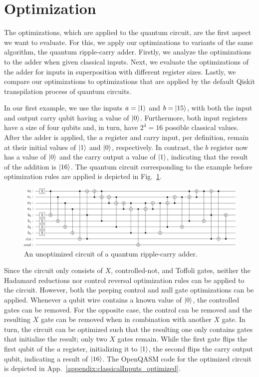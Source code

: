 \section{Optimization}
\label{sec:eval_optimization}
The optimizations, which are applied to the quantum circuit, are the first aspect we want to evaluate. For this, we apply our optimizations to variants of the same algorithm, the quantum ripple-carry adder. Firstly, we analyze the optimizations to the adder when given classical inputs. Next, we evaluate the optimizations of the adder for inputs in superposition with different register sizes. Lastly, we compare our optimizations to optimizations that are applied by the default Qiskit transpilation process of quantum circuits.

In our first example, we use the inputs $a = \ket{1}$ and $b = \ket{15}$, with both the input and output carry qubit having a value of $\ket{0}$. Furthermore, both input registers have a size of four qubits and, in turn, have $2^4 = 16$ possible classical values. After the adder is applied, the $a$ register and carry input, per definition, remain at their initial values of $\ket{1}$ and $\ket{0}$, respectively. In contrast, the $b$ register now has a value of $\ket{0}$ and the carry output a value of $\ket{1}$, indicating that the result of the addition is $\ket{16}$.
The quantum circuit corresponding to the example before optimization rules are applied is depicted in Fig.~\ref{fig:eval_adder_circuit}.
\begin{figure}[htp]
    \centering     
    \includegraphics[width=\textwidth]{../figures/images/adderCircuit.png}
    \caption{An unoptimized circuit of a quantum ripple-carry adder.}
    \label{fig:eval_adder_circuit}
\end{figure}

Since the circuit only consists of $X$, controlled-not, and Toffoli gates, neither the Hadamard reductions nor control reversal optimization rules can be applied to the circuit. However, both the peeping control and null gate optimizations can be applied. Whenever a qubit wire contains a known value of $\ket{0}$, the controlled gates can be removed. For the opposite case, the control can be removed and the resulting $X$ gate can be removed when in combination with another $X$ gate. In turn, the circuit can be optimized such that the resulting one only contains gates that initialize the result; only two $X$ gates remain. While the first gate flips the first qubit of the $a$ register, initializing it to $\ket{1}$, the second flips the carry output qubit, indicating a result of $\ket{16}$. The OpenQASM code for the optimized circuit is depicted in App.~\ref{appendix:classicalInputs_optimized}.

